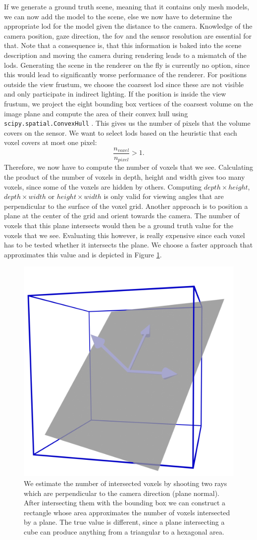 If we generate a ground truth scene, meaning that it contains only mesh models, we can now add the model to the scene, else we now have to determine the appropriate \ac{lod} for the model given the distance to the camera.
Knowledge of the camera position, gaze direction, the \ac{fov} and the sensor resolution are essential for that.
Note that a consequence is, that this information is baked into the scene description and moving the camera during rendering leads to a mismatch of the \acp{lod}.
Generating the scene in the renderer on the fly is currently no option, since this would lead to significantly worse performance of the renderer.
For positions outside the view frustum, we choose the coarsest \ac{lod} since these are not visible and only participate in indirect lighting.
If the position is inside the view frustum, we project the eight bounding box vertices of the coarsest volume on the image plane and compute the area of their convex hull using \texttt{scipy.spatial.ConvexHull} \cite{scipy}.
This gives us the number of pixels that the volume covers on the sensor.
We want to select \acp{lod} based on the heuristic that each voxel covers at most one pixel:
\begin{equation*}
    \frac{n_{voxel}}{n_{pixel}} > 1.
\end{equation*}
Therefore, we now have to compute the number of voxels that we see.
Calculating the product of the number of voxels in depth, height and width gives too many voxels, since some of the voxels are hidden by others.
Computing $depth \times height$, $depth \times width$ or $height \times width$ is only valid for viewing angles that are perpendicular to the surface of the voxel grid.
Another approach is to position a plane at the center of the grid and orient towards the camera.
The number of voxels that this plane intersects would then be a ground truth value for the voxels that we see.
Evaluating this however, is really expensive since each voxel has to be tested whether it intersects the plane.
We choose a faster approach that approximates this value and is depicted in Figure \ref{fig:voxel_estimation}.
\begin{figure}[ht]
    \centering
    \includegraphics[width=0.3\linewidth]{img/voxel_estimation.png}
    \caption[Estimation of intersected voxels]{We estimate the number of intersected voxels by shooting two rays which are perpendicular to the camera direction (plane normal). After intersecting them with the bounding box we can construct a rectangle whose area approximates the number of voxels intersected by a plane. The true value is different, since a plane intersecting a cube can produce anything from a triangular to a hexagonal area.}
    \label{fig:voxel_estimation}
\end{figure}
